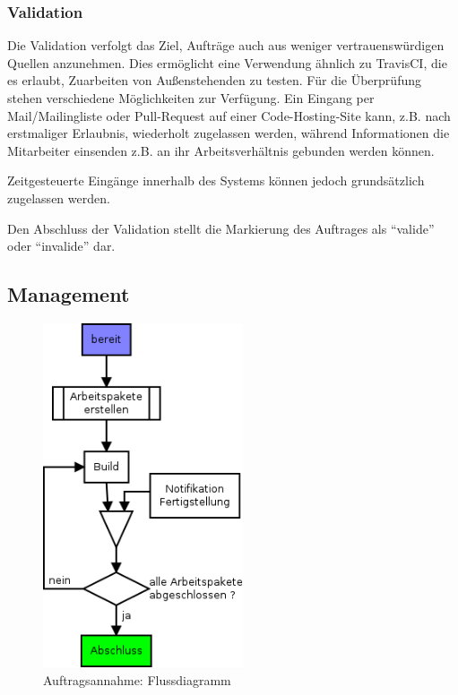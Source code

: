 \subsubsection{Validation}


Die Validation verfolgt das Ziel, Aufträge auch aus weniger vertrauenswürdigen Quellen anzunehmen.
Dies ermöglicht eine Verwendung ähnlich zu TravisCI, die es erlaubt, Zuarbeiten von Außenstehenden zu testen.
Für die Überprüfung stehen verschiedene Möglichkeiten zur Verfügung.
Ein Eingang per Mail/Mailingliste oder Pull-Request auf einer Code-Hosting-Site kann,
z.B. nach erstmaliger Erlaubnis, wiederholt zugelassen werden,
während Informationen die Mitarbeiter einsenden z.B. an ihr Arbeitsverhältnis gebunden werden können.

Zeitgesteuerte Eingänge innerhalb des Systems können jedoch grundsätzlich zugelassen werden.

Den Abschluss der Validation stellt die Markierung des Auftrages als ``valide'' oder ``invalide'' dar.

\subsection{Management}

\begin{figure}[ht] 
  \centering
  \includegraphics[height=4in]{imageinput/lebenszyklus-auftrag-abarbeitung.png}
  \caption{Auftragsannahme: Flussdiagramm}
  \label{fig:lebenszyklus-auftrag-abarbeitung}
\end{figure}

